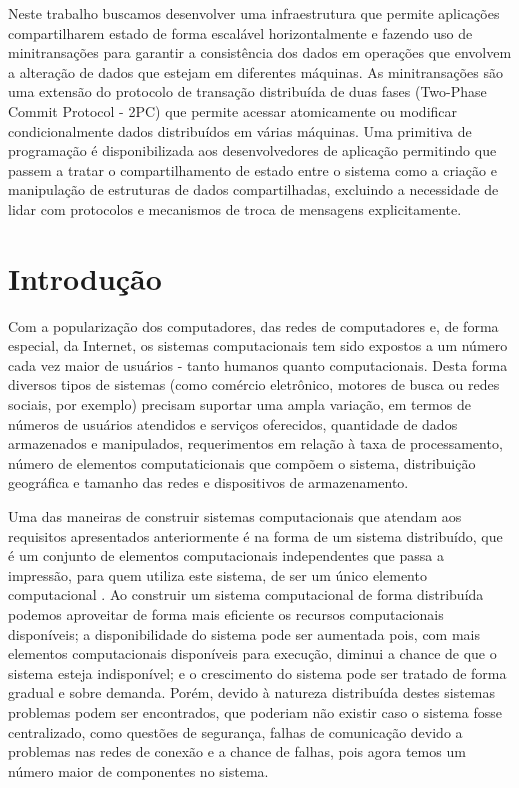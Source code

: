 \documentclass[11pt,twoside,a4paper]{book}
\begin{document}
Neste trabalho buscamos desenvolver uma infraestrutura que permite aplicações compartilharem estado de forma escalável horizontalmente e fazendo uso de minitransações para garantir a consistência dos dados em operações que envolvem a alteração de dados que estejam em diferentes máquinas. As minitransações são uma extensão do protocolo de transação distribuída de duas fases (Two-Phase Commit Protocol - 2PC) que permite acessar atomicamente ou modificar condicionalmente dados distribuídos em várias máquinas. Uma primitiva de programação é disponibilizada aos desenvolvedores de aplicação permitindo que passem a tratar o compartilhamento de estado entre o sistema como a criação e manipulação de estruturas de dados compartilhadas, excluindo a necessidade de lidar com protocolos e mecanismos de troca de mensagens explicitamente.
\tableofcontents
\listoftables
\listoffigures

\chapter{Introdução}
Com a popularização dos computadores, das redes de computadores e, de forma especial, da Internet, os sistemas computacionais tem sido expostos a um número cada vez maior de usuários - tanto humanos quanto computacionais. Desta forma diversos tipos de sistemas (como comércio eletrônico, motores de busca ou redes sociais, por exemplo) precisam suportar uma ampla variação, em termos de números de usuários atendidos e serviços oferecidos, quantidade de dados armazenados e manipulados, requerimentos em relação à taxa de processamento, número de elementos computaticionais que compõem o sistema, distribuição geográfica e tamanho das redes e dispositivos de armazenamento. 

Uma das maneiras de construir sistemas computacionais que atendam aos requisitos apresentados anteriormente é na forma de um sistema distribuído, que é um conjunto de elementos computacionais independentes que passa a impressão, para quem utiliza este sistema, de ser um único elemento computacional \cite{ds-tanenbaum}. Ao construir um sistema computacional de forma distribuída podemos aproveitar de forma mais eficiente os recursos computacionais disponíveis; a disponibilidade do sistema pode ser aumentada pois, com mais elementos computacionais disponíveis para execução, diminui a chance de que o sistema esteja indisponível; e o crescimento do sistema pode ser tratado de forma gradual e sobre demanda. Porém, devido à natureza distribuída destes sistemas problemas podem ser encontrados, que poderiam não existir caso o sistema fosse centralizado, como questões de segurança, falhas de comunicação devido a problemas nas redes de conexão e a chance de falhas, pois agora temos um número maior de componentes no sistema.
\end{document}

